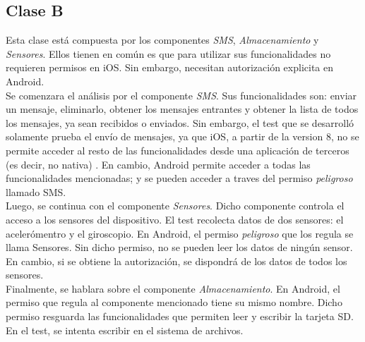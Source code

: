 \subsection{Clase B}
Esta clase está compuesta por los componentes \emph{SMS}, \emph{Almacenamiento} y \emph{Sensores}. Ellos tienen en común es que para utilizar sus funcionalidades no requieren permisos en iOS. Sin embargo, necesitan autorización explicita en Android.\\
Se comenzara el análisis por el componente \emph{SMS}. Sus funcionalidades son: enviar un mensaje, eliminarlo, obtener los mensajes entrantes y obtener la lista de todos los mensajes, ya sean recibidos o enviados. Sin embargo, el test que se desarrolló solamente prueba el envío de mensajes, ya que iOS, a partir de la version 8, no se permite acceder al resto de las funcionalidades desde una aplicación de terceros (es decir, no nativa) \cite{foda, foda2}. En cambio, Android permite acceder a todas las funcionalidades mencionadas; y se pueden acceder a traves del permiso \textit{peligroso} llamado SMS.\\
Luego, se continua con el componente \emph{Sensores}. Dicho componente controla el acceso a los sensores del dispositivo. El test recolecta datos de dos sensores: el acelerómentro y el giroscopio. En Android, el permiso \textit{peligroso} que los regula se llama Sensores. Sin dicho permiso, no se pueden leer los datos de ningún sensor. En cambio, si se obtiene la autorización, se dispondrá de los datos de todos los sensores.\\
Finalmente, se hablara sobre el componente \emph{Almacenamiento}. En Android, el permiso que regula al componente mencionado tiene su mismo nombre. Dicho permiso resguarda las funcionalidades que permiten leer y escribir la tarjeta SD. En el test, se intenta escribir en el sistema de archivos.
